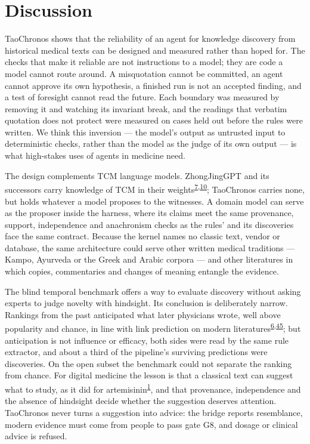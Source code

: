 \documentclass[
]{article}
\begin{document}
\hypertarget{discussion}{%
\section{Discussion}\label{discussion}}

TaoChronos shows that the reliability of an agent for knowledge
discovery from historical medical texts can be designed and measured
rather than hoped for. The checks that make it reliable are not
instructions to a model; they are code a model cannot route around. A
misquotation cannot be committed, an agent cannot approve its own
hypothesis, a finished run is not an accepted finding, and a test of
foresight cannot read the future. Each boundary was measured by removing
it and watching its invariant break, and the readings that verbatim
quotation does not protect were measured on cases held out before the
rules were written. We think this inversion --- the model's output as
untrusted input to deterministic checks, rather than the model as the
judge of its own output --- is what high-stakes uses of agents in
medicine need.

The design complements TCM language models. ZhongJingGPT and its
successors carry knowledge of TCM in their
weights\textsuperscript{\protect\hyperlink{ref-kang2025zhongjinggpt}{7},\protect\hyperlink{ref-yang2024zhongjing}{10}};
TaoChronos carries none, but holds whatever a model proposes to the
witnesses. A domain model can serve as the proposer inside the harness,
where its claims meet the same provenance, support, independence and
anachronism checks as the rules' and its discoveries face the same
contract. Because the kernel names no classic text, vendor or database,
the same architecture could serve other written medical traditions ---
Kampo, Ayurveda or the Greek and Arabic corpora --- and other
literatures in which copies, commentaries and changes of meaning
entangle the evidence.

The blind temporal benchmark offers a way to evaluate discovery without
asking experts to judge novelty with hindsight. Its conclusion is
deliberately narrow. Rankings from the past anticipated what later
physicians wrote, well above popularity and chance, in line with link
prediction on modern
literatures\textsuperscript{\protect\hyperlink{ref-krenn2023forecasting}{6},\protect\hyperlink{ref-libennowell2007link}{45}};
but anticipation is not influence or efficacy, both sides were read by
the same rule extractor, and about a third of the pipeline's surviving
predictions were discoveries. On the open subset the benchmark could not
separate the ranking from chance. For digital medicine the lesson is
that a classical text can suggest what to study, as it did for
artemisinin\textsuperscript{\protect\hyperlink{ref-tu2011artemisinin}{1}},
and that provenance, independence and the absence of hindsight decide
whether the suggestion deserves attention. TaoChronos never turns a
suggestion into advice: the bridge reports resemblance, modern evidence
must come from people to pass gate G8, and dosage or clinical advice is
refused.
\end{document}
